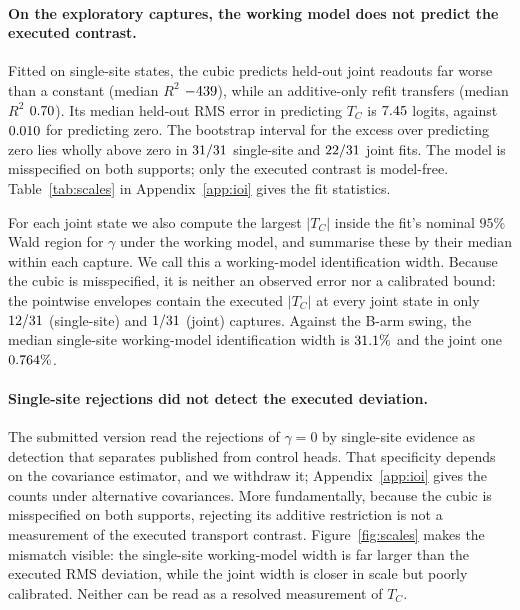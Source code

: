 \documentclass{article}
\theoremstyle{plain}
\theoremstyle{definition}
\begin{document}
\paragraph{On the exploratory captures, the working model does not predict the executed contrast.} Fitted on
single-site states, the cubic predicts held-out joint readouts far worse than a constant (median $R^2$ $-439$),
while an additive-only refit transfers (median $R^2$ $0.70$). Its median held-out RMS error in predicting
$T_C$ is $7.45$ logits, against $0.010$ for predicting zero. The bootstrap interval for the excess over
predicting zero lies wholly above zero in $31/31$ single-site and $22/31$ joint fits. The model is misspecified
on both supports; only the executed contrast is model-free. Table~\ref{tab:scales} in Appendix~\ref{app:ioi} gives the
fit statistics.

For each joint state we also compute the largest $|T_C|$ inside the fit's nominal $95\%$ Wald region for $\gamma$ under
the working model, and summarise these by their median within each capture. We call this a working-model
identification width. Because the cubic is misspecified, it is neither an observed error nor a calibrated bound: the
pointwise envelopes contain the executed $|T_C|$ at every joint state in only $12/31$ (single-site) and
$1/31$ (joint) captures. Against the B-arm swing, the median single-site working-model identification
width is $31.1\%$ and the joint one $0.764\%$.

\paragraph{Single-site rejections did not detect the executed deviation.} The submitted version read the rejections of
$\gamma=0$ by single-site evidence as detection that separates published from control heads. That specificity depends
on the covariance estimator, and we withdraw it; Appendix~\ref{app:ioi} gives the counts under alternative
covariances. More fundamentally, because the cubic is misspecified on both supports, rejecting its additive
restriction is not a measurement of the executed transport contrast. Figure~\ref{fig:scales} makes the mismatch
visible: the single-site working-model width is far larger than the executed RMS deviation, while the joint width is
closer in scale but poorly calibrated. Neither can be read as a resolved measurement of $T_C$.
\end{document}
